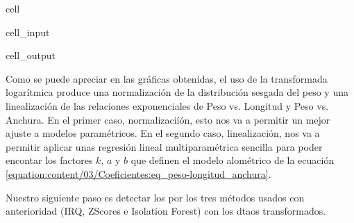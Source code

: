\documentclass[a4paper,10pt,spanish]{jupyterBook}
\begin{document}
\begin{sphinxuseclass}{cell}
\begin{sphinxVerbatimInput}
\begin{sphinxuseclass}{cell_input}
\end{sphinxuseclass}\end{sphinxVerbatimInput}
\begin{sphinxVerbatimOutput}

\begin{sphinxuseclass}{cell_output}
\noindent{}

\noindent{}

\noindent{}

\end{sphinxuseclass}\end{sphinxVerbatimOutput}

\end{sphinxuseclass}
\sphinxAtStartPar
Como se puede apreciar en las gráficas obtenidas, el uso de la transformada logarítmica produce una normalización de la distribución sesgada del peso y una linealización de las relaciones exponenciales de Peso vs. Longitud y Peso vs. Anchura. En el primer caso, normalizaciíón, esto nos va a permitir un mejor ajuste a modelos paramétricos. En el segundo caso, linealización, nos va a permitir aplicar unas regresión lineal multiparamétrica sencilla para poder encontar los factores \(k\), \(a\) y \(b\) que definen el modelo alométrico de la ecuación \eqref{equation:content/03/Coeficientes:eq_peso-longitud_anchura}.

\sphinxAtStartPar
Nuestro siguiente paso es detectar los  por los tres métodos usados con anterioridad (IRQ, Z\sphinxhyphen{}Scores e Isolation Forest) con los dtaos transformados.
\end{document}
